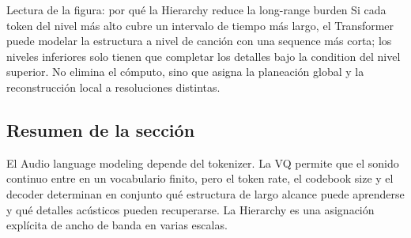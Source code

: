 \begin{knowledgebox}{Lectura de la figura: por qué la Hierarchy reduce la long-range burden}
Si cada token del nivel más alto cubre un intervalo de tiempo más largo, el Transformer puede modelar la estructura a nivel de canción con una sequence más corta; los niveles inferiores solo tienen que completar los detalles bajo la condition del nivel superior. No elimina el cómputo, sino que asigna la planeación global y la reconstrucción local a resoluciones distintas.
\end{knowledgebox}


\subsection{Resumen de la sección}

El Audio language modeling depende del tokenizer. La VQ permite que el sonido continuo entre en un vocabulario finito, pero el token rate, el codebook size y el decoder determinan en conjunto qué estructura de largo alcance puede aprenderse y qué detalles acústicos pueden recuperarse. La Hierarchy es una asignación explícita de ancho de banda en varias escalas.
